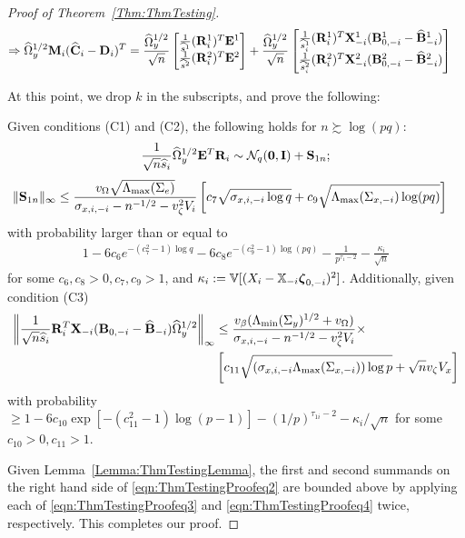\documentclass[12pt, letterpaper]{article}
\numberwithin{equation}{section}
\begin{document}
\begin{proof}[Proof of Theorem~\ref{Thm:ThmTesting}]
\begin{align}
\Rightarrow
\widehat \Omega_y^{1/2} {\mathbf{M}}_i ( \widehat {{\mathbf{C}}}_i - {\mathbf{D}}_i)^T &=
\frac{\widehat \Omega_y^{1/2}}{\sqrt n}
\begin{bmatrix}
\frac{1}{\widehat s^1} ({\mathbf{R}}^1_i)^T {\mathbf{E}}^1 \\
\frac{1}{\widehat s^2} ({\mathbf{R}}^2_i)^T {\mathbf{E}}^2
\end{bmatrix} +
\frac{\widehat \Omega_y^{1/2}}{\sqrt n}
\begin{bmatrix}
\frac{1}{\widehat s^1_i} ({\mathbf{R}}^1_i)^T {\mathbf{X}}_{-i}^1 ({\mathbf{B}}_{0,-i}^1 - \widehat {{\mathbf{B}}}_{-i}^1) \\
\frac{1}{\widehat s^2_i} ({\mathbf{R}}^2_i)^T {\mathbf{X}}_{-i}^2 ({\mathbf{B}}_{0,-i}^2 - \widehat {{\mathbf{B}}}_{-i}^2)
\end{bmatrix}\label{eqn:ThmTestingProofeq2}
\end{align}

At this point, we drop $k$ in the subscripts, and prove the following:

\begin{Lemma}\label{Lemma:ThmTestingLemma}
Given conditions (C1) and (C2), the following holds for $n \succsim \log (pq)$:
%
$$
\frac{1}{\sqrt n \widehat s_i}  \widehat \Omega_y^{1/2} {\mathbf{E}}^T {\mathbf{R}}_i \sim
{\cal{N}}_q ({\bf 0}, {\mathbf{I}}) + {\mathbf{S}}_{1n};
$$
%
\begin{align}\label{eqn:ThmTestingProofeq3}
\| {\mathbf{S}}_{1n} \|_\infty & \leq 
\frac{v_\Omega \sqrt{\Lambda_{\max} (\Sigma_e) } }{\sigma_{x,i,-i} - n^{-1/2} - v_\zeta^2 V_i}
\left[ c_7 \sqrt{ \sigma_{x,i,-i} \log q} +
c_9  \sqrt{\Lambda_{\max} (\Sigma_{x,-i}) \log (p q)} \right]
\end{align}
%
with probability larger than or equal to
%
\begin{align}\label{eqn:ThmTestingProofeq30}
1 - 6c_6 e^{-(c_7^2-1) \log q} - 6c_8 e^{-(c_9^2-1) \log(p q)} - \frac{1}{p^{\tau_1-2}} - 
\frac{\kappa_i}{\sqrt n}
\end{align}
%
for some $c_6, c_8 >0, c_7, c_9 > 1$, and $\kappa_i := {\mathbb{V}} [(X_i - {\mathbb{X}}_{-i} {\boldsymbol{\zeta}}_{0,-i})^2]$.
%
Additionally, given condition (C3)
%
\begin{align}\label{eqn:ThmTestingProofeq4}
\left\| \frac{1}{\sqrt n \widehat s_i} {\mathbf{R}}_i^T {\mathbf{X}}_{-i} ({\mathbf{B}}_{0,-i} - \widehat {{\mathbf{B}}}_{-i})
\widehat \Omega_y^{1/2} \right\|_\infty & \leq
\frac{v_\beta ( \Lambda_{\min} (\Sigma_y)^{1/2} + v_\Omega)}{\sigma_{x,i,-i} - n^{-1/2} - v_\zeta^2 V_i} \times \notag\\
& \left[ c_{11} \sqrt{ (\sigma_{x,i,-i} \Lambda_{\max} (\Sigma_{x, -i}) ) \log p} + \sqrt n v_\zeta V_x \right]
\end{align}
%
with probability $\geq 1 - 6c_{10} \exp [-(c_{11}^2-1) \log (p-1)] - (1/p)^{\tau_{1 i}-2} - \kappa_i/ \sqrt n$ for some $c_{10} >0, c_{11} > 1$.
\end{Lemma}

Given Lemma~\ref{Lemma:ThmTestingLemma}, the first and second summands on the right hand side of \eqref{eqn:ThmTestingProofeq2} are bounded above by applying each of \eqref{eqn:ThmTestingProofeq3} and \eqref{eqn:ThmTestingProofeq4} twice, respectively. This completes our proof.
\end{proof}
\end{document}
